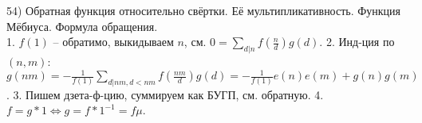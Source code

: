 ﻿54) Обратная функция относительно свёртки. Её мультипликативность. Функция Мёбиуса. Формула обращения.\\
1. $f(1)$ -- обратимо, выкидываем $n$, см. $0=\sum_{d|n}f(\frac{n}{d})g(d)$. 2. Инд-ция по $(n, m)$: $g(nm)=-\frac{1}{f(1)}\sum_{d|nm, d<nm}f(\frac{nm}{d})g(d)=-\frac{1}{f(1)}e(n)e(m)+g(n)g(m)$. 3. Пишем дзета-ф-цию, суммируем как БУГП, см. обратную. 4. $f=g*1 \Leftrightarrow g=f*1^{-1}=f\mu$.\\
